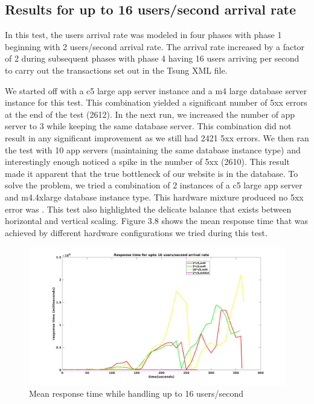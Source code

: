 \subsection{Results for up to 16 users/second arrival rate}

In this test, the users arrival rate was modeled in four phases with phase 1 beginning with 2 users/second arrival rate. The arrival rate increased by a factor of 2 during subsequent phases with phase 4 having 16 users arriving per second to carry out the transactions set out in the Tsung XML file. 

We started off with a c5 large app server instance and a m4 large database server instance for this test. This combination yielded a significant number of 5xx errors at the end of the test (2612). In the next run, we increased the number of app server to 3 while keeping the same database server. This combination did not result in any significant improvement as we still had 2421 5xx errors. We then ran the test with 10 app servers (maintaining the same database instance type) and interestingly enough noticed a spike in the number of 5xx (2610). This result made it apparent that the true bottleneck of our website is in the database. To solve the problem, we tried a combination of 2 instances of a c5 large app server and m4.4xlarge database instance type. This hardware mixture produced no 5xx error was . This test also highlighted the delicate balance that exists between horizontal and vertical scaling. Figure 3.8 shows the mean response time that was achieved by different hardware configurations we tried during this test.

\begin{figure}[h]
	\centering
	\includegraphics[width=1\textwidth]{images/scale16.jpg}
	\caption{Mean response time while handling up to 16 users/second}\label{fig:sqlopt}
\end{figure}

